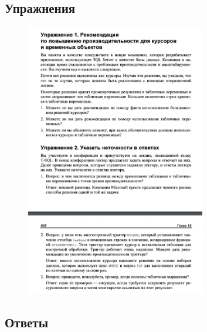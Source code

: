 \newpage
\subsection*{Упражнения}

\begin{figure}[h!]
	\begin{center}
		\includegraphics[width=0.7\textwidth]{img/ex20.png}
	\end{center}
	\captionsetup{justification=centering}
\end{figure}


\newpage
\subsection*{Ответы}


